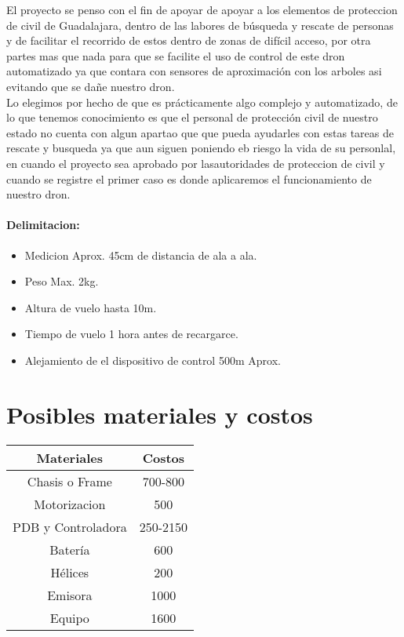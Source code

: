 \documentclass[11pt,a4paper]{article}
\begin{document}
El proyecto se penso con el fin de apoyar de apoyar a los elementos de proteccion de civil de Guadalajara, dentro de las labores de búsqueda y rescate de personas y de facilitar el recorrido de estos dentro de zonas de difícil acceso, por otra partes mas que nada para que se facilite el uso de control de este dron automatizado ya que contara con sensores de aproximación con los arboles asi evitando que se dañe nuestro dron.\\
Lo elegimos por hecho de que es prácticamente algo complejo y automatizado, de lo que tenemos conocimiento es que el personal de protección civil de nuestro estado no cuenta con algun apartao que que pueda ayudarles con estas tareas de rescate y busqueda ya que aun siguen poniendo eb riesgo la vida de su personlal, en cuando el proyecto sea aprobado por lasautoridades de proteccion de civil y cuando se registre el primer caso es donde aplicaremos el funcionamiento de nuestro dron.

\paragraph{Delimitacion:}


\begin{itemize}
\item Medicion Aprox. 45cm de distancia de ala a ala.
\item Peso Max. 2kg.
\item Altura de vuelo hasta 10m.
\item Tiempo de vuelo 1 hora antes de recargarce.
\item Alejamiento de el dispositivo de control 500m Aprox.
\end{itemize} 

\section{Posibles materiales y costos}

\begin{tabular}{|c|c|}
\hline
\textbf{Materiales} & \textbf{Costos}\\ \hline
Chasis o Frame & 700-800 \\ \hline
Motorizacion & 500 \\ \hline
PDB y Controladora & 250-2150 \\ \hline
Batería & 600 \\ \hline
Hélices & 200 \\ \hline
Emisora & 1000 \\ \hline
Equipo & 1600 \\ \hline
\end{tabular}
\end{document}
